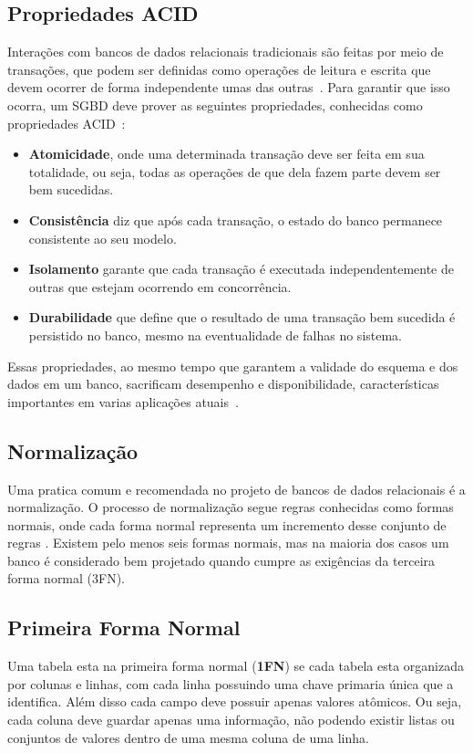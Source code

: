 \subsection{Propriedades ACID}
	Interações com bancos de dados relacionais tradicionais são feitas por meio de transações, que podem ser definidas como operações de leitura e escrita que devem ocorrer de forma independente umas das outras~\cite{dmsbook}. Para garantir que isso ocorra, um SGBD deve prover as seguintes propriedades, conhecidas como propriedades ACID~\cite{haerder}:
	\begin{itemize}
	\item \textbf{Atomicidade}, onde uma determinada transação deve ser feita em sua totalidade, ou seja, todas as operações de que dela fazem parte devem ser bem sucedidas.
	\item \textbf{Consistência} diz que após cada transação, o estado do banco permanece consistente ao seu modelo.
	\item \textbf{Isolamento} garante que cada transação é executada independentemente de outras que estejam ocorrendo em concorrência.
	\item \textbf{Durabilidade} que define que o resultado de uma transação bem sucedida é persistido no banco, mesmo na eventualidade de falhas no sistema.
	\end{itemize}

	Essas propriedades, ao mesmo tempo que garantem a validade do esquema e dos dados em um banco, sacrificam desempenho e disponibilidade, características importantes em varias aplicações atuais~\cite{foxcluster}.

\subsection{Normalização}
	Uma pratica comum e recomendada no projeto de bancos de dados relacionais é a normalização. O processo de normalização segue regras conhecidas como formas normais, onde cada forma normal representa um incremento desse conjunto de regras \cite{jan}. 
	Existem pelo menos seis formas normais, mas na maioria dos casos um banco é considerado bem projetado quando cumpre as exigências da terceira forma normal (3FN).

\subsection*{Primeira Forma Normal}
	Uma tabela esta na primeira forma normal (\textbf{1FN}) se cada tabela esta organizada por colunas e linhas, com cada linha possuindo uma chave primaria única que a identifica. 
	Além disso cada campo deve possuir apenas valores atômicos. Ou seja, cada coluna deve guardar apenas uma informação, não podendo existir listas ou conjuntos de valores dentro de uma mesma coluna de uma linha.

